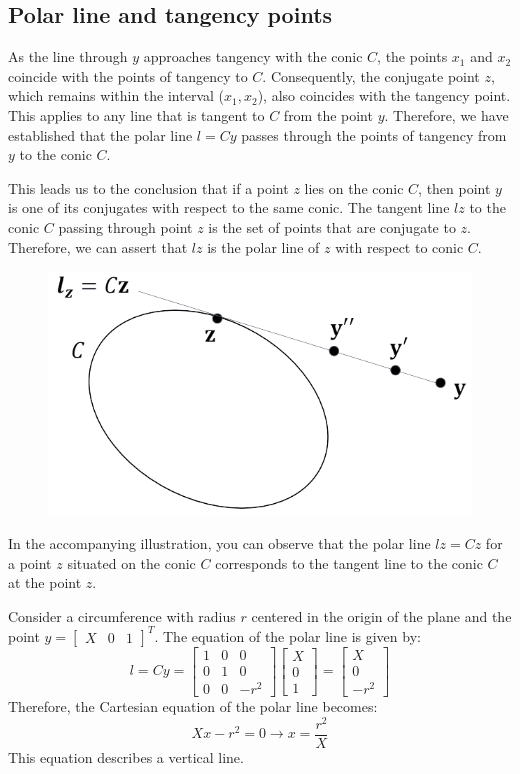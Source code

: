 \documentclass[12pt, a4paper]{report}
\begin{document}
    \subsection{Polar line and tangency points}
    As the line through $y$ approaches tangency with the conic $C$, the points $x_1$ and $x_2$ coincide with the points of tangency to $C$. 
    Consequently, the conjugate point $z$, which remains within the interval ($x_1,x_2$), also coincides with the tangency point. 
    This applies to any line that is tangent to $C$ from the point $y$.
    Therefore, we have established that the polar line $l=Cy$ passes through the points of tangency from $y$ to the conic $C$. 

    This leads us to the conclusion that if a point $z$ lies on the conic $C$, then point $y$ is one of its conjugates with respect to the same conic. 
    The tangent line $lz$ to the conic $C$ passing through point $z$ is the set of points that are conjugate to $z$. 
    Therefore, we can assert that $lz$ is the polar line of $z$ with respect to conic $C$.
    \begin{figure}[H]
        \centering
        \includegraphics[width=0.4\linewidth]{images/tangentpolar.png}
    \end{figure}
    In the accompanying illustration, you can observe that the polar line $lz = Cz$ for a point $z$ situated on the conic $C$ corresponds to the tangent line to the conic $C$ at the point $z$.
    \begin{example}
        Consider a circumference with radius $r$ centered in the origin of the plane and the point $y={\begin{bmatrix} X & 0 & 1 \end{bmatrix}}^T$. 
        The equation of the polar line is given by:
        \[
        l=Cy=
        \begin{bmatrix}
            1 & 0 & 0 \\
            0 & 1 & 0 \\
            0 & 0 & -r^2
        \end{bmatrix}    
        \begin{bmatrix}
            X \\
            0 \\
            1 
        \end{bmatrix}    
        = 
        \begin{bmatrix}
            X \\
            0 \\
            -r^2 
        \end{bmatrix}  
        \]
        Therefore, the Cartesian equation of the polar line becomes: 
        \[X x-r^2 = 0 \rightarrow x=\dfrac{r^2}{X}\]
        This equation describes a vertical line.
    \end{example}
\end{document}

